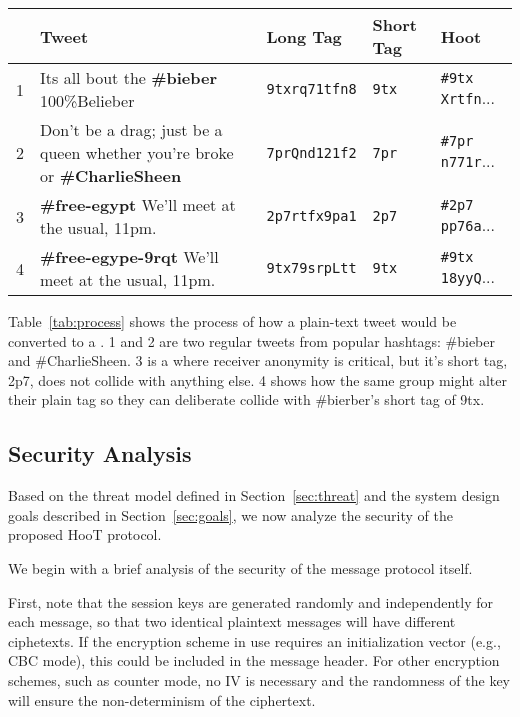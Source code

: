 \begin{table*}
\caption{\hoot Process
\label{tab:process}
}
\begin{center}
    \begin{tabular}{ l  l  l  l  l }
	\hline
	 & Tweet & Long Tag & Short Tag & Hoot \\ \hline
	1 & Its all bout the {\bf \#bieber} 100\%Belieber                                 & {\tt 9txrq71tfn8} &  {\tt 9tx} & {\tt \#9tx Xrtfn}... \\
	2 & Don't be a drag; just be a queen whether you're broke or {\bf \#CharlieSheen} & {\tt 7prQnd121f2} & {\tt 7pr} & {\tt \#7pr n771r}... \\
	3 & {\bf \#free-egypt} We'll meet at the usual, 11pm.                             & {\tt 2p7rtfx9pa1} & {\tt 2p7} & {\tt \#2p7 pp76a}... \\
	4 & {\bf \#free-egype-9rqt} We'll meet at the usual, 11pm.                        & {\tt 9tx79srpLtt} &  {\tt 9tx}  & {\tt \#9tx 18yyQ}... \\
    \end{tabular}
\end{center}
\end{table*}

Table~\ref{tab:process} shows the process of how a plain-text tweet would be converted to a \hoot. 1 and 2 are two regular tweets from popular hashtags: \#bieber and \#CharlieSheen. 3 is a \hoot where receiver anonymity is critical, but it's short tag, 2p7, does not collide with anything else. 4 shows how the same group might alter their plain tag so they can deliberate collide with \#bierber's short tag of 9tx.


\subsection{Security Analysis}
\label{sec:security}

Based on the threat model defined in Section~\ref{sec:threat} and the
system design goals described in Section~\ref{sec:goals}, we now analyze
the security of the proposed HooT protocol.

%
We begin with a brief analysis of the security of the message protocol
itself.

First, note that the session keys are generated randomly and
independently for each message, so that two identical plaintext messages
will have different ciphetexts. If the encryption scheme in use requires
an initialization vector (e.g., CBC mode), this could be included in the
message header. For other encryption schemes, such as counter mode, no
IV is necessary and the randomness of the key will ensure the
non-determinism of the ciphertext.

